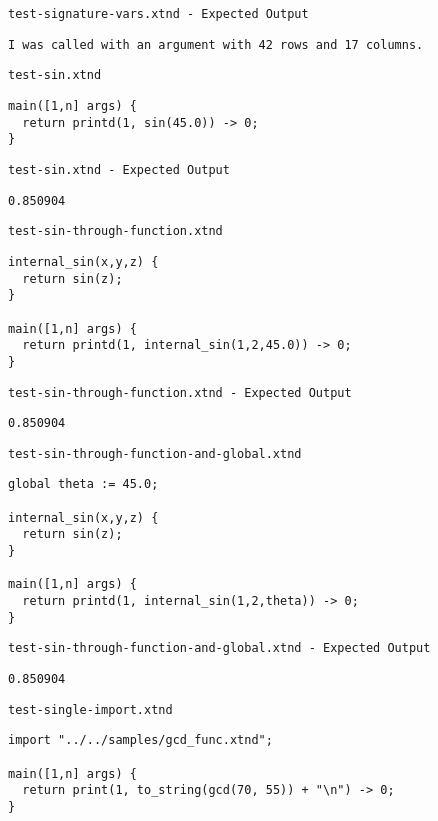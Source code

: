\medskip \noindent \texttt{test-signature-vars.xtnd - Expected Output}


\begin{lstlisting}
I was called with an argument with 42 rows and 17 columns.
\end{lstlisting}


\medskip \noindent \texttt{test-sin.xtnd}


\begin{lstlisting}
main([1,n] args) {
  return printd(1, sin(45.0)) -> 0;
}
\end{lstlisting}


\medskip \noindent \texttt{test-sin.xtnd - Expected Output}


\begin{lstlisting}
0.850904
\end{lstlisting}


\medskip \noindent \texttt{test-sin-through-function.xtnd}


\begin{lstlisting}
internal_sin(x,y,z) {
  return sin(z);
}

main([1,n] args) {
  return printd(1, internal_sin(1,2,45.0)) -> 0;
}
\end{lstlisting}


\medskip \noindent \texttt{test-sin-through-function.xtnd - Expected Output}


\begin{lstlisting}
0.850904
\end{lstlisting}


\medskip \noindent \texttt{test-sin-through-function-and-global.xtnd}


\begin{lstlisting}
global theta := 45.0;

internal_sin(x,y,z) {
  return sin(z);
}

main([1,n] args) {
  return printd(1, internal_sin(1,2,theta)) -> 0;
}
\end{lstlisting}


\medskip \noindent \texttt{test-sin-through-function-and-global.xtnd - Expected Output}


\begin{lstlisting}
0.850904
\end{lstlisting}


\medskip \noindent \texttt{test-single-import.xtnd}


\begin{lstlisting}
import "../../samples/gcd_func.xtnd";

main([1,n] args) {
  return print(1, to_string(gcd(70, 55)) + "\n") -> 0;
}
\end{lstlisting}


